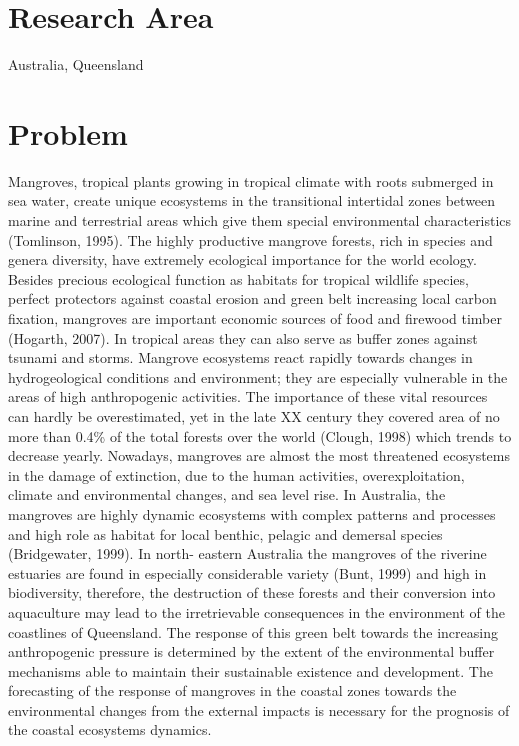 \documentclass[11pt]{paper}
\begin{document}
\section{Research Area}
Australia, Queensland

\section{Problem}
Mangroves, tropical plants growing in tropical climate with roots submerged in sea water, create unique ecosystems in the transitional intertidal zones between marine and terrestrial areas which give them special environmental characteristics (Tomlinson, 1995). The highly productive mangrove forests, rich in species and genera diversity, have extremely ecological importance for the world ecology. Besides precious ecological function as habitats for tropical wildlife species, perfect protectors against coastal erosion and green belt increasing local carbon fixation, mangroves are important economic sources of food and firewood timber (Hogarth, 2007). In tropical areas they can also serve as buffer zones against tsunami and storms. Mangrove ecosystems react rapidly towards changes in hydrogeological conditions and environment; they are especially vulnerable in the areas of high anthropogenic activities. The importance of these vital resources can hardly be overestimated, yet in the late XX century they covered area of no more than 0.4\% of the total forests over the world (Clough, 1998) which trends to decrease yearly. Nowadays, mangroves are almost the most threatened ecosystems in the damage of extinction, due to the human activities, overexploitation, climate and environmental changes, and sea level rise. In Australia, the mangroves are highly dynamic ecosystems with complex patterns and processes and high role as habitat for local benthic, pelagic and demersal species (Bridgewater, 1999). In north- eastern Australia the mangroves of the riverine estuaries are found in especially considerable variety (Bunt, 1999) and high in biodiversity, therefore, the destruction of these forests and their conversion into aquaculture may lead to the irretrievable consequences in the environment of the coastlines of Queensland. The response of this green belt towards the increasing anthropogenic pressure is determined by the extent of the environmental buffer mechanisms able to maintain their sustainable existence and development. The forecasting of the response of mangroves in the coastal zones towards the environmental changes from the external impacts is necessary for the prognosis of the coastal ecosystems dynamics.
\end{document}
